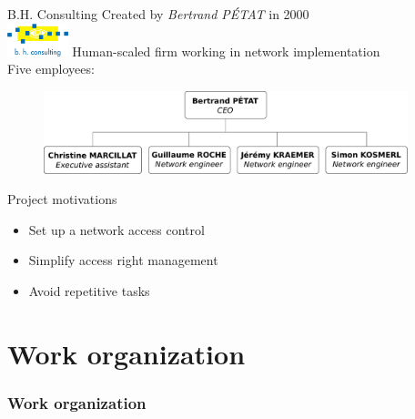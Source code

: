 \documentclass[12pt]{beamer}
\begin{document}
    
\begin{frame}{B.H. Consulting}
    Created by \emph{Bertrand PÉTAT} in 2000\\
    \hfill
	\includegraphics[width=50pt]{img/BHConsulting.jpg}
    \vfill
    Human-scaled firm working in network implementation\\
    \vfill
    Five employees:
    \begin{figure}
	\includegraphics[width=300pt]{img/organigramme_en.pdf}
    \end{figure}
\end{frame}


\begin{frame}{Project motivations}
    \begin{itemize}[<+->]
	\item Set up a network access control 
	\vfill
	\item Simplify access right management
	\vfill
	\item Avoid repetitive tasks
    \end{itemize}

\end{frame}
    
\part{Work organization}
\frame{\partpage}
\section{Work organization}
\end{document}
